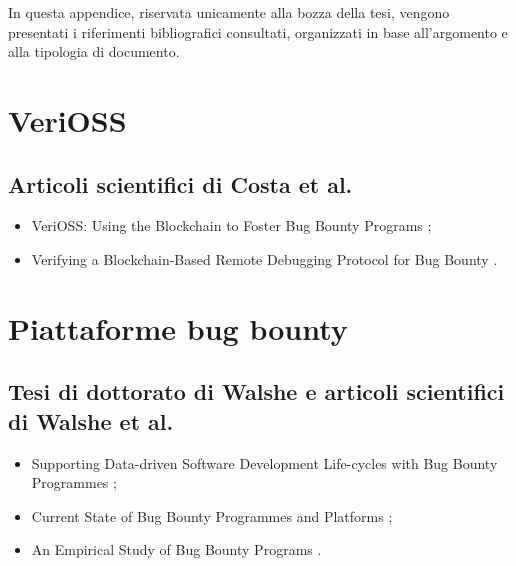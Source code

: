 
In questa appendice, riservata unicamente alla bozza della tesi, vengono presentati i riferimenti bibliografici consultati, organizzati in base all'argomento e alla tipologia di documento.

\section*{VeriOSS}

\subsection*{Articoli scientifici di Costa et al.}
\begin{itemize}

\item VeriOSS: Using the Blockchain to Foster Bug Bounty Programs \cite{canidio2021verioss};

\item Verifying a Blockchain-Based Remote Debugging Protocol for Bug Bounty \cite{degano2021verioss}.

\end{itemize}

\section*{Piattaforme bug bounty}

\subsection*{Tesi di dottorato di Walshe e articoli scientifici di Walshe et al.}
\begin{itemize}

\item Supporting Data-driven Software Development Life-cycles with Bug Bounty Programmes \cite{walshe2023bountythesis};

\item Current State of Bug Bounty Programmes and Platforms \cite{walshe2023bountythesis3};

\item An Empirical Study of Bug Bounty Programs \cite{walshe2020bountypaper}.

\end{itemize}

